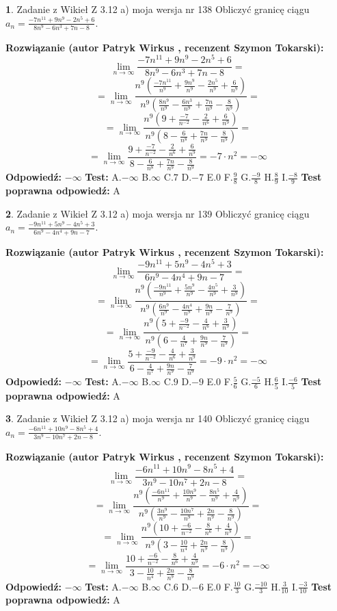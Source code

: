 \documentclass[12pt, a4paper]{article}
\theoremstyle{definition} %
\newtheorem{zad}{}
\newcommand{\zadStart}[1]{\begin{zad}#1\newline}
\newcommand{\zadStop}{\end{zad}}
\newcommand{\rozwStart}[2]{\noindent \textbf{Rozwiązanie (autor #1 , recenzent #2): }\newline}
\newcommand{\rozwStop}{\newline}
\newcommand{\odpStart}{\noindent \textbf{Odpowiedź:}\newline}
\newcommand{\odpStop}{\newline}
\newcommand{\testStart}{\noindent \textbf{Test:}\newline}
\newcommand{\testStop}{\newline}
\newcommand{\kluczStart}{\noindent \textbf{Test poprawna odpowiedź:}\newline}
\newcommand{\kluczStop}{\newline}
\begin{document}
\zadStart{Zadanie z Wikieł Z 3.12 a) moja wersja nr 138}
Obliczyć granicę ciągu $a_{n}=\frac{-7n^{11}+9n^{9}-2n^{5}+6}{8n^{9}-6n^{3}+7n-8}$.
\zadStop
\rozwStart{Patryk Wirkus}{Szymon Tokarski}
$$\lim\limits_{n\to\infty}\frac{-7n^{11}+9n^{9}-2n^{5}+6}{8n^{9}-6n^{3}+7n-8}=$$
$$=\lim\limits_{n\to\infty}\frac{n^{9}\left(\frac{-7n^{11}}{n^{9}}+\frac{9n^{9}}{n^{9}}-\frac{2n^{5}}{n^{9}}+\frac{6}{n^{9}}\right)}{n^{9}\left(\frac{8n^{9}}{n^{9}}-\frac{6n^{3}}{n^{9}}+\frac{7n}{n^{9}}-\frac{8}{n^{9}}\right)}=$$
$$=\lim\limits_{n\to\infty}\frac{n^{9}\left(9+\frac{-7}{n^{-2}}-\frac{2}{n^{6}}+\frac{6}{n^{9}}\right)}
{n^{9}\left(8-\frac{6}{n^{8}}+\frac{7n}{n^{9}}-\frac{8}{n^{9}}\right)}=$$
$$=\lim\limits_{n\to\infty}\frac{9+\frac{-7}{n^{-2}}-\frac{2}{n^{6}}+\frac{6}{n^{9}}}{8-\frac{6}{n^{8}}+\frac{7n}{n^{9}}-\frac{8}{n^{9}}}=-7\cdot n^{2} = -\infty$$
\rozwStop
\odpStart
$-\infty$
\odpStop
\testStart
A.$-\infty$
B.$\infty$
C.$7$
D.$-7$
E.$0$
F.$\frac{9}{8}$
G.$\frac{-9}{8}$
H.$\frac{8}{9}$
I.$\frac{-8}{9}$
\testStop
\kluczStart
A
\kluczStop



\zadStart{Zadanie z Wikieł Z 3.12 a) moja wersja nr 139}
Obliczyć granicę ciągu $a_{n}=\frac{-9n^{11}+5n^{9}-4n^{5}+3}{6n^{9}-4n^{4}+9n-7}$.
\zadStop
\rozwStart{Patryk Wirkus}{Szymon Tokarski}
$$\lim\limits_{n\to\infty}\frac{-9n^{11}+5n^{9}-4n^{5}+3}{6n^{9}-4n^{4}+9n-7}=$$
$$=\lim\limits_{n\to\infty}\frac{n^{9}\left(\frac{-9n^{11}}{n^{9}}+\frac{5n^{9}}{n^{9}}-\frac{4n^{5}}{n^{9}}+\frac{3}{n^{9}}\right)}{n^{9}\left(\frac{6n^{9}}{n^{9}}-\frac{4n^{4}}{n^{9}}+\frac{9n}{n^{9}}-\frac{7}{n^{9}}\right)}=$$
$$=\lim\limits_{n\to\infty}\frac{n^{9}\left(5+\frac{-9}{n^{-2}}-\frac{4}{n^{6}}+\frac{3}{n^{9}}\right)}
{n^{9}\left(6-\frac{4}{n^{7}}+\frac{9n}{n^{9}}-\frac{7}{n^{9}}\right)}=$$
$$=\lim\limits_{n\to\infty}\frac{5+\frac{-9}{n^{-2}}-\frac{4}{n^{6}}+\frac{3}{n^{9}}}{6-\frac{4}{n^{7}}+\frac{9n}{n^{9}}-\frac{7}{n^{9}}}=-9\cdot n^{2} = -\infty$$
\rozwStop
\odpStart
$-\infty$
\odpStop
\testStart
A.$-\infty$
B.$\infty$
C.$9$
D.$-9$
E.$0$
F.$\frac{5}{6}$
G.$\frac{-5}{6}$
H.$\frac{6}{5}$
I.$\frac{-6}{5}$
\testStop
\kluczStart
A
\kluczStop



\zadStart{Zadanie z Wikieł Z 3.12 a) moja wersja nr 140}
Obliczyć granicę ciągu $a_{n}=\frac{-6n^{11}+10n^{9}-8n^{5}+4}{3n^{9}-10n^{7}+2n-8}$.
\zadStop
\rozwStart{Patryk Wirkus}{Szymon Tokarski}
$$\lim\limits_{n\to\infty}\frac{-6n^{11}+10n^{9}-8n^{5}+4}{3n^{9}-10n^{7}+2n-8}=$$
$$=\lim\limits_{n\to\infty}\frac{n^{9}\left(\frac{-6n^{11}}{n^{9}}+\frac{10n^{9}}{n^{9}}-\frac{8n^{5}}{n^{9}}+\frac{4}{n^{9}}\right)}{n^{9}\left(\frac{3n^{9}}{n^{9}}-\frac{10n^{7}}{n^{9}}+\frac{2n}{n^{9}}-\frac{8}{n^{9}}\right)}=$$
$$=\lim\limits_{n\to\infty}\frac{n^{9}\left(10+\frac{-6}{n^{-2}}-\frac{8}{n^{6}}+\frac{4}{n^{9}}\right)}
{n^{9}\left(3-\frac{10}{n^{4}}+\frac{2n}{n^{9}}-\frac{8}{n^{9}}\right)}=$$
$$=\lim\limits_{n\to\infty}\frac{10+\frac{-6}{n^{-2}}-\frac{8}{n^{6}}+\frac{4}{n^{9}}}{3-\frac{10}{n^{4}}+\frac{2n}{n^{9}}-\frac{8}{n^{9}}}=-6\cdot n^{2} = -\infty$$
\rozwStop
\odpStart
$-\infty$
\odpStop
\testStart
A.$-\infty$
B.$\infty$
C.$6$
D.$-6$
E.$0$
F.$\frac{10}{3}$
G.$\frac{-10}{3}$
H.$\frac{3}{10}$
I.$\frac{-3}{10}$
\testStop
\kluczStart
A
\kluczStop
\end{document}
